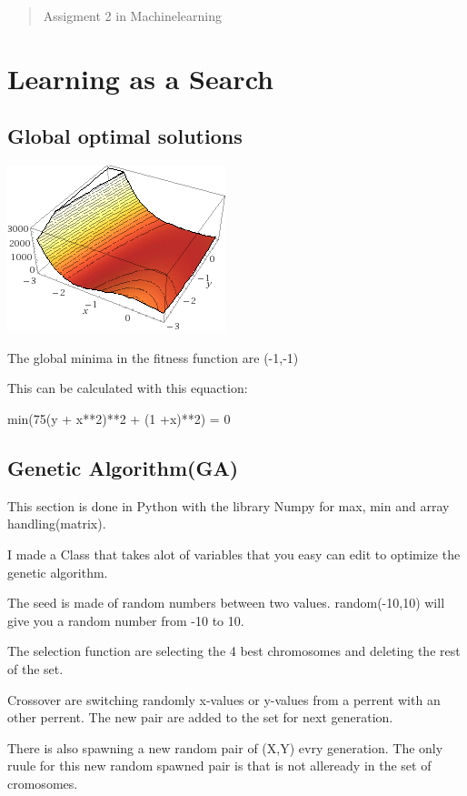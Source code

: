 \documentclass[a4paper,12pt,pdftex]{article}
\begin{document}
\begin{abstract}

    Assigment 2 in Machinelearning

\end{abstract}

\section{Learning as a Search}
\subsection{Global optimal solutions}

\includegraphics{3dplot.png}

The global minima in the fitness function are (-1,-1) 

This can be calculated with this equaction:

min(75(y + x**2)**2 + (1 +x)**2) = 0

\subsection{Genetic Algorithm(GA)}

This section is done in Python with the library Numpy for max, min and array
handling(matrix). 

I made a Class that takes alot of variables that you easy can edit to optimize
the genetic algorithm. 

The seed is made of random numbers between two values. random(-10,10) will give
you a random number from -10 to 10. 

The selection function are selecting the 4 best chromosomes and deleting the
rest of the set. 

Crossover are switching randomly x-values or y-values from a perrent with an
other perrent. The new pair are added to the set for next generation.

There is also spawning a new random pair of (X,Y) evry generation. The only
ruule for this new random spawned pair is that is not alleready in the set of
cromosomes. 
\end{document}
